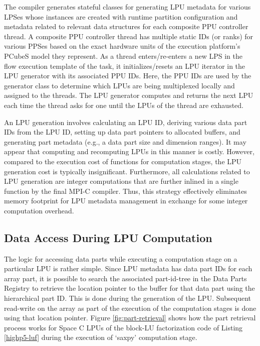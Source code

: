 \documentclass[ASNA,twocolumn]{USG} %
\begin{document}
{The compiler generates stateful classes for generating LPU metadata for various LPSes whose instances are created with runtime partition configuration and metadata related to relevant data structures for each composite PPU controller thread. A composite PPU controller thread has multiple static IDs (or ranks) for various PPSes based on the exact hardware units of the execution platform's PCubeS model they represent. As a thread enters/re-enters a new LPS in the flow execution template of the task, it initializes/resets an LPU iterator in the LPU generator with its associated PPU IDs. Here, the PPU IDs are used by the generator class to determine which LPUs are being multiplexed locally and assigned to the threads. The LPU generator computes and returns the next LPU each time the thread asks for one until the LPUs of the thread are exhausted. 

An LPU generation involves calculating an LPU ID, deriving various data part IDs from the LPU ID, setting up data part pointers to allocated buffers, and generating part metadata (e.g., a data part size and dimension ranges). It may appear that computing and recomputing LPUs in this manner is costly. However, compared to the execution cost of functions for computation stages, the LPU generation cost is typically insignificant. Furthermore, all calculations related to LPU generation are integer computations that are further inlined in a single function by the final MPI-C compiler. Thus, this strategy effectively eliminates memory footprint for LPU metadata management in exchange for some integer computation overhead.  

\subsection{Data Access During LPU Computation}
\label{subsec:lpu-data-access}
The logic for accessing data parts while executing a computation stage on a particular LPU is rather simple. Since LPU metadata has data part IDs for each array part, it is possible to search the associated part-id-tree in the Data Parts Registry to retrieve the location pointer to the buffer for that data part using the hierarchical part ID. This is done during the generation of the LPU. Subsequent read-write on the array as part of the execution of the computation stages is done using that location pointer. Figure \ref{fig:part-retrieval} shows how the part retrieval process works for Space C LPUs of the block-LU factorization code of Listing \ref{highp5-luf} during the execution of `saxpy' computation stage.

}
\end{document}
